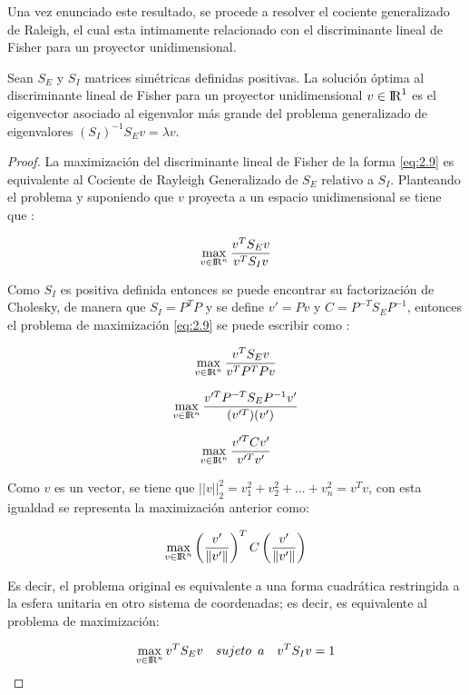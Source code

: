 Una vez enunciado este resultado, se procede a resolver el cociente generalizado de Raleigh, el cual esta intimamente relacionado con el discriminante lineal de Fisher para un proyector unidimensional.


\begin{proposition}\label{lemma2.3}
Sean $S_E$ y $S_I$ matrices simétricas definidas positivas. La solución óptima al discriminante lineal de Fisher para un proyector unidimensional $v \in {\rm I\!R}^{1}$ es el eigenvector asociado al eigenvalor más grande del problema generalizado de eigenvalores $(S_I)^{-1}S_E v = \lambda v$.
\end{proposition}

\begin{proof}
La maximización del discriminante lineal de Fisher de la forma \ref{eq:2.9} es equivalente al Cociente de Rayleigh Generalizado de $S_E$ relativo a $S_I$. Planteando el problema y suponiendo que $v$ proyecta a un espacio unidimensional se tiene que \cite{hastie2009elements}:

$$  \max_{v \in {\rm I\!R}^{n} } \frac{v^T S_E v}{v^T S_I v}  $$

Como $S_I$ es positiva definida entonces se puede encontrar su factorización de Cholesky, de manera que $S_I = P^T P$ y se define $v' = P v$ y $C= P^{-T} S_E P^{-1} $, entonces el problema de maximización \ref{eq:2.9} se puede escribir como \cite{hastie2009elements}:

$$\max_{v \in {\rm I\!R}^{n} } \frac{v^T S_E v}{v^T P^T P v} $$

$$\max_{v \in {\rm I\!R}^{n} } \frac{v'^T P^{-T}S_E P^{-1}v'}{(v'^T)(v')} $$

$$\max_{v \in {\rm I\!R}^{n} } \frac{v'^T C v'}{v'^Tv'} $$

Como $v$ es un vector, se tiene que $||v||^2_2 = v_1^2 + v_2^2 + ... + v_n^2 = v^T v$, con esta igualdad se representa la maximización anterior como:

$$ \max_{v \in {\rm I\!R}^{n} }
\left(\frac{v'}{\left\Vert{v'}\right\Vert}\right)^T C \left(\frac{v'}{\left\Vert{v'}\right\Vert}\right) $$

Es decir, el problema original es equivalente a una forma cuadrática restringida a la esfera unitaria en otro sistema de coordenadas; es decir, es equivalente al problema de maximización:


\begin{equation}\label{eq:2.15}
\max_{v \in {\rm I\!R}^{n}} v^T S_E v  \quad sujeto \enspace a \quad v^T S_I v = 1	
\end{equation}



\end{proof}
